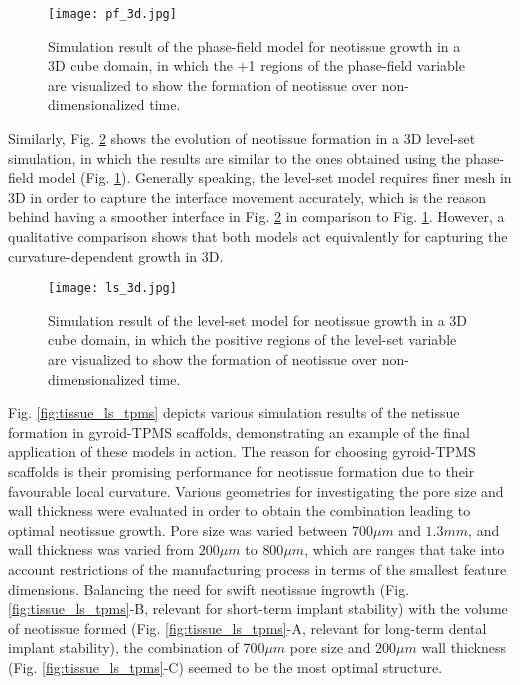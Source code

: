 \begin{figure}
\centering
\medskip
\texttt{[image: pf\_3d.jpg]}
\caption[Simulation result of the phase-field model for neotissue growth in a 3D cube domain]{Simulation result of the phase-field model for neotissue growth in a 3D cube domain, in which the +1 regions of the phase-field variable are visualized to show the formation of neotissue over non-dimensionalized time.}
\label{fig:tissue_pf_3d}
\end{figure}

Similarly, Fig. \ref{fig:tissue_ls_3d} shows the evolution of neotissue formation in a 3D level-set simulation, in which the results are similar to the ones obtained using the phase-field model (Fig. \ref{fig:tissue_pf_3d}). Generally speaking, the level-set model requires finer mesh in 3D in order to capture the interface movement accurately, which is the reason behind having a smoother interface in Fig. \ref{fig:tissue_ls_3d} in comparison to Fig. \ref{fig:tissue_pf_3d}. However, a qualitative comparison shows that both models act equivalently for capturing the curvature-dependent growth in 3D.

\begin{figure}
\centering
\medskip
\texttt{[image: ls\_3d.jpg]}
\caption[Simulation result of the level-set model for neotissue growth in a 3D cube domain]{Simulation result of the level-set model for neotissue growth in a 3D cube domain, in which the positive regions of the level-set variable are visualized to show the formation of neotissue over non-dimensionalized time.}
\label{fig:tissue_ls_3d}
\end{figure}

Fig. \ref{fig:tissue_ls_tpms} depicts various simulation results of the netissue formation in gyroid-{TPMS} scaffolds, demonstrating an example of the final application of these models in action. The reason for choosing gyroid-{TPMS} scaffolds is their promising performance for neotissue formation due to their favourable local curvature. Various geometries for investigating the pore size and wall thickness were evaluated in order to obtain the combination leading to optimal neotissue growth. Pore size was varied between $700  \mu m$ and $1.3 mm $, and wall thickness was varied from $200 \mu m $ to $800 \mu m$, which are ranges that take into account restrictions of the manufacturing process in terms of the smallest feature dimensions. Balancing the need for swift neotissue ingrowth (Fig. \ref{fig:tissue_ls_tpms}-B, relevant for short-term implant stability) with the volume of neotissue formed (Fig. \ref{fig:tissue_ls_tpms}-A, relevant for long-term dental implant stability), the combination of $700 \mu m$ pore size and $200 \mu m $ wall thickness (Fig. \ref{fig:tissue_ls_tpms}-C) seemed to be the most optimal structure.

